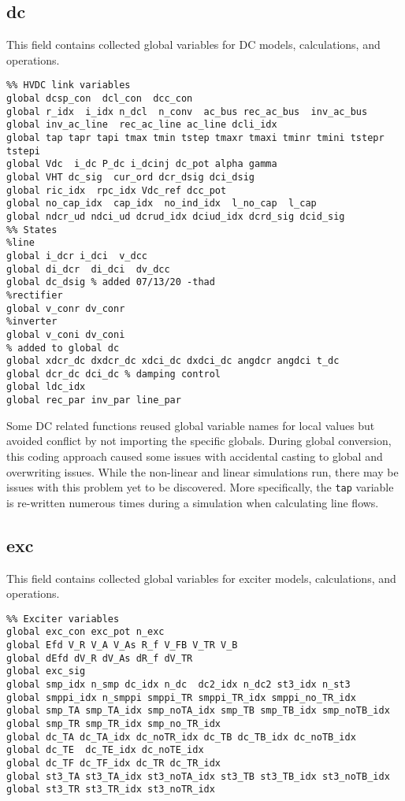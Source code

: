 \subsection{dc}
This field contains collected global variables for DC models, calculations, and operations.
\begin{verbatim}
%% HVDC link variables 
global dcsp_con  dcl_con  dcc_con
global r_idx  i_idx n_dcl  n_conv  ac_bus rec_ac_bus  inv_ac_bus
global inv_ac_line  rec_ac_line ac_line dcli_idx
global tap tapr tapi tmax tmin tstep tmaxr tmaxi tminr tmini tstepr tstepi
global Vdc  i_dc P_dc i_dcinj dc_pot alpha gamma 
global VHT dc_sig  cur_ord dcr_dsig dci_dsig
global ric_idx  rpc_idx Vdc_ref dcc_pot
global no_cap_idx  cap_idx  no_ind_idx  l_no_cap  l_cap
global ndcr_ud ndci_ud dcrud_idx dciud_idx dcrd_sig dcid_sig
%% States
%line
global i_dcr i_dci  v_dcc
global di_dcr  di_dci  dv_dcc
global dc_dsig % added 07/13/20 -thad
%rectifier
global v_conr dv_conr
%inverter
global v_coni dv_coni
% added to global dc
global xdcr_dc dxdcr_dc xdci_dc dxdci_dc angdcr angdci t_dc
global dcr_dc dci_dc % damping control
global ldc_idx
global rec_par inv_par line_par
\end{verbatim}

Some DC related functions reused global variable names for local values but avoided conflict by not importing the specific globals.
During global conversion, this coding approach caused some issues with accidental casting to global and overwriting issues.
While the non-linear and linear simulations run, there may be issues with this problem yet to be discovered.
More specifically, the \verb|tap| variable is re-written numerous times during a simulation when calculating line flows.



\subsection{exc}
This field contains collected global variables for exciter models, calculations, and operations.
\begin{verbatim}
%% Exciter variables
global exc_con exc_pot n_exc
global Efd V_R V_A V_As R_f V_FB V_TR V_B
global dEfd dV_R dV_As dR_f dV_TR
global exc_sig 
global smp_idx n_smp dc_idx n_dc  dc2_idx n_dc2 st3_idx n_st3
global smppi_idx n_smppi smppi_TR smppi_TR_idx smppi_no_TR_idx 
global smp_TA smp_TA_idx smp_noTA_idx smp_TB smp_TB_idx smp_noTB_idx
global smp_TR smp_TR_idx smp_no_TR_idx 
global dc_TA dc_TA_idx dc_noTR_idx dc_TB dc_TB_idx dc_noTB_idx
global dc_TE  dc_TE_idx dc_noTE_idx
global dc_TF dc_TF_idx dc_TR dc_TR_idx
global st3_TA st3_TA_idx st3_noTA_idx st3_TB st3_TB_idx st3_noTB_idx
global st3_TR st3_TR_idx st3_noTR_idx
\end{verbatim}

